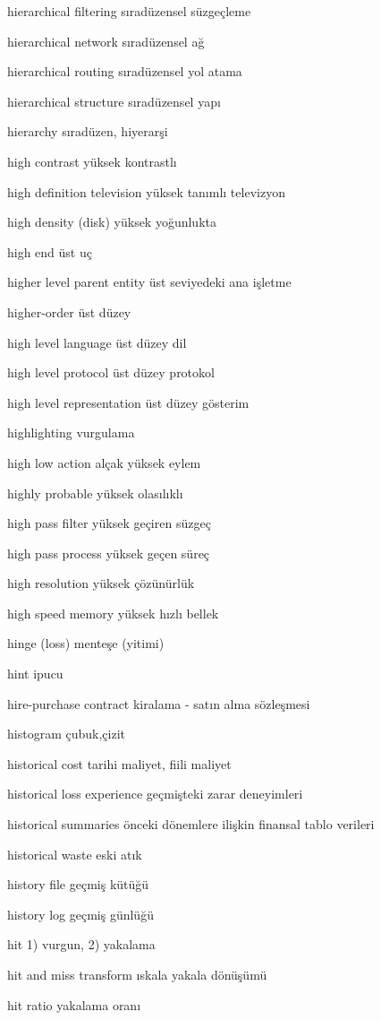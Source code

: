 \documentclass[12pt,fleqn]{article}\usepackage{../../common}
\begin{document}
hierarchical filtering sıradüzensel süzgeçleme

hierarchical network sıradüzensel ağ

hierarchical routing sıradüzensel yol atama

hierarchical structure sıradüzensel yapı

hierarchy sıradüzen, hiyerarşi

high contrast yüksek kontrastlı

high definition television yüksek tanımlı televizyon

high density (disk) yüksek yoğunlukta

high end üst uç

higher level parent entity üst seviyedeki ana işletme

higher-order üst düzey

high level language üst düzey dil

high level protocol üst düzey protokol

high level representation üst düzey gösterim

highlighting vurgulama

high low action alçak yüksek eylem

highly probable yüksek olasılıklı

high pass filter yüksek geçiren süzgeç

high pass process yüksek geçen süreç

high resolution yüksek çözünürlük

high speed memory yüksek hızlı bellek

hinge (loss) menteşe (yitimi)

hint ipucu

hire-purchase contract kiralama - satın alma sözleşmesi

histogram çubuk,çizit

historical cost tarihi maliyet, fiili maliyet

historical loss experience geçmişteki zarar deneyimleri

historical summaries önceki dönemlere ilişkin finansal tablo verileri

historical waste eski atık

history file geçmiş kütüğü

history log geçmiş günlüğü

hit 1) vurgun, 2) yakalama

hit and miss transform ıskala yakala dönüşümü

hit ratio yakalama oranı
\end{document}
